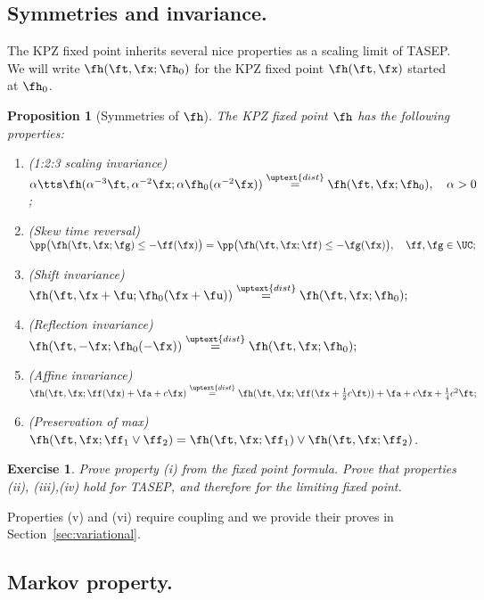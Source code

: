 \documentclass[]{pcmi}
\theoremstyle{plain}
\newtheorem{proposition}[equation]{Proposition}
\newtheorem{exercise}[equation]{Exercise}
\theoremstyle{definition}
\begin{document}
\subsection{Symmetries and invariance.}

The KPZ fixed point inherits several nice properties as a scaling limit of TASEP. We will write $\fh(\ft, \fx;\fh_0)$ for the KPZ fixed point $\fh(\ft, \fx)$ started at $\fh_0$.

\begin{proposition}[Symmetries of $\fh$]\label{symmetries}
The KPZ fixed point $\fh$ has the following properties:
\begin{enumerate}[label=\emph{(\roman*)}]
\item (1:2:3 scaling invariance)\hskip0.1in
$\alpha\tts\fh(\alpha^{-3}\ft,\alpha^{-2}\fx;\alpha\fh_0(\alpha^{-2}\fx) )\stackrel{\uptext{dist}}{=} \fh(\ft, \fx;\fh_0), \quad \alpha>0$;
\item  (Skew time reversal) \hskip0.1in
$\pp\big(\fh(\ft,\fx; \fg)\le -\ff(\fx)\big) =\pp\big(\fh(\ft,\fx;\ff)\le -\fg(\fx)\big),\quad\ff,\fg\in\UC;$
\item (Shift invariance) \hskip0.1in$\fh(\ft,\fx+\fu; \fh_0(\fx+\fu))\stackrel{\uptext{dist}}{=} \fh(\ft,\fx; \fh_0);$
\item  (Reflection invariance) \hskip0.1in$\fh(\ft, -\fx;\fh_0(-\fx))\stackrel{\uptext{dist}}{=} \fh(\ft,\fx; \fh_0);$
\item (Affine invariance)  \hskip0.1in$\fh(\ft,\fx; \ff(\fx) + \fa + c\fx)\stackrel{\uptext{dist}}{=} \fh(\ft,\fx; \ff(\fx+\frac12c\ft)) + \fa + c\fx + \frac14c^2\ft;$
\item (Preservation of max) \hskip0.1in$\fh(\ft,\fx;\ff_1\vee \ff_2)= \fh(\ft,\fx; \ff_1)\vee \fh(\ft,\fx; \ff_2)$.
\end{enumerate}
\end{proposition}

\begin{exercise}  Prove property (i) from the fixed point formula.  Prove that properties (ii), (iii),(iv) hold for TASEP, and therefore for the limiting
fixed point.  
\end{exercise} 

\noindent Properties (v) and  (vi) require coupling and we provide their proves in Section~\ref{sec:variational}.

\subsection{Markov property.}
\end{document}

